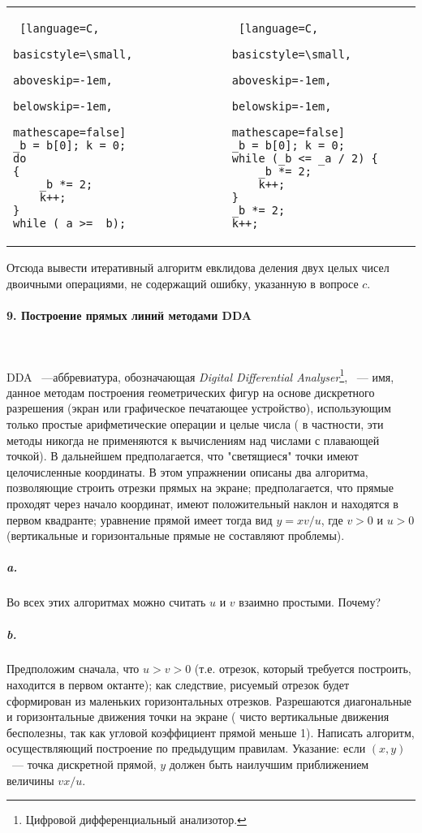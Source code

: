 \begin{tabular}{p{6cm} p{6cm}}
\centering
\begin{lstlisting} [language=C,
					basicstyle=\small,
					aboveskip=-1em,
					belowskip=-1em,
					mathescape=false]			
_b = b[0]; k = 0;
do 
{
	_b *= 2;
	k++;
}
while (_a >= _b);
\end{lstlisting}&
\begin{lstlisting} [language=C,
					basicstyle=\small,
					aboveskip=-1em,
					belowskip=-1em,
					mathescape=false]
_b = b[0]; k = 0;
while (_b <= _a / 2) {
	_b *= 2;
	k++;
}
_b *= 2;
k++;
\end{lstlisting}
\end{tabular}

Отсюда вывести итеративный алгоритм евклидова деления двух целых чисел двоичными операциями, не содержащий ошибку, указанную в вопросе $c$. 

\paragraph { 9. Построение прямых линий методами DDA}\ \newline

DDA ~---аббревиатура, обозначающая \textit{Digital Differential Analyser}\footnote[1]{Цифровой дифференциальный анализотор.}, ~--- имя, данное методам построения геометрических фигур на основе дискретного разрешения (экран или графическое печатающее устройство), использующим только простые арифметические операции и целые числа ( в частности, эти методы никогда не применяются к вычислениям над числами с плавающей точкой). В дальнейшем предполагается, что "светящиеся" точки имеют целочисленные координаты. 
В этом упражнении описаны два алгоритма, позволяющие строить отрезки прямых на экране; предполагается, что прямые проходят через начало координат, имеют положительный наклон и находятся в первом квадранте; уравнение прямой имеет тогда вид $y=xv/u$, где $v>0$ и $u>0$ (вертикальные и горизонтальные прямые не составляют проблемы). 

\subparagraph { a.} Во всех этих алгоритмах можно считать $u$ и $v$ взаимно простыми. Почему?

\subparagraph { b.} Предположим сначала, что $u>v>0$ (т.е. отрезок, который требуется построить, находится в первом октанте); как следствие, рисуемый отрезок будет сформирован из маленьких горизонтальных отрезков. Разрешаются диагональные и горизонтальные движения точки на экране ( чисто вертикальные движения бесполезны, так как угловой коэффициент прямой меньше 1). Написать алгоритм, осуществляющий построение по предыдущим правилам. Указание: если $\left({x,y}\right)$ ~--- точка дискретной прямой, $y$ должен быть наилучшим приближением величины $vx/u$. 

